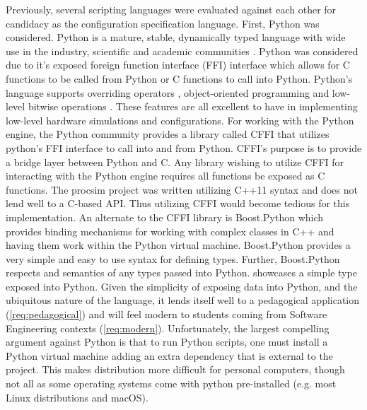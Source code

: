 Previously, several scripting languages were evaluated against each other for candidacy as the configuration specification language. First, Python \cite{Python:Homepage} was considered. Python is a mature, stable, dynamically typed language with wide use in the industry, scientific and academic communities \cite{StackOverflowSurvey2016}. Python was considered due to it's exposed foreign function interface (FFI) interface which allows for C functions to be called from Python or C functions to call into Python. Python's language supports overriding operators \cite{Python:Operators}, object-oriented programming \cite{Python:Classes} and low-level bitwise operations \cite{Python:BuiltinTypes}. These features are all excellent to have in implementing low-level hardware simulations and configurations. For working with the Python engine, the Python community provides a library called CFFI that utilizes python's FFI interface to call into and from Python. CFFI's purpose is to provide a bridge layer between Python and C. Any library wishing to utilize CFFI for interacting with the Python engine requires all functions be exposed as C functions. The procsim project was written utilizing C++11 syntax and does not lend well to a C-based API. Thus utilizing CFFI would become tedious for this implementation. An alternate to the CFFI library is Boost.Python \cite{Boost1.53.0:Python} which provides binding mechanisms for working with complex classes in C++ and having them work within the Python virtual machine. Boost.Python provides a very simple and easy to use syntax for defining types. Further, Boost.Python respects  and  semantics of any types passed into Python.  showcases a simple type exposed into Python. Given the simplicity of exposing data into Python, and the ubiquitous nature of the language, it lends itself well to a pedagogical application (\cref{req:pedagogical}) and will feel modern to students coming from Software Engineering contexts (\cref{req:modern}). Unfortunately, the largest compelling argument against Python is that to run Python scripts, one must install a Python virtual machine adding an extra dependency that is external to the project. This makes distribution more difficult for personal computers, though not all as some operating systems come with python pre-installed (e.g. most Linux distributions and macOS).

